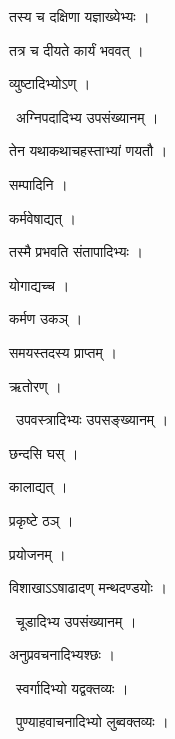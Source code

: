\documentclass[10pt, openany, oneside]{book}
\begin{document}
\noindent तस्य च दक्षिणा यज्ञाख्येभ्यः ।

\noindent तत्र च दीयते कार्यं भववत् ।

\noindent व्युष्टादिभ्योऽण् ।

\par\noindent\hspace{1.5em}{\vps वा॰}~{\qt अग्निपदादिभ्य उपसंख्यानम् ।}

\noindent तेन यथाकथाचहस्ताभ्यां णयतौ ।

\noindent सम्पादिनि ।

\noindent कर्मवेषाद्यत् ।

\noindent तस्मै प्रभवति संतापादिभ्यः ।

\noindent योगाद्यच्च ।

\noindent कर्मण उकञ् ।

\noindent समयस्तदस्य प्राप्तम् ।

\noindent ऋतोरण् ।

\par\noindent\hspace{1.5em}{\vps वा॰}~{\qt उपवस्त्रादिभ्यः उपसङ्ख्यानम् ।}

\noindent छन्दसि घस् ।

\noindent कालाद्यत् ।

\noindent प्रकृष्टे ठञ् ।

\noindent प्रयोजनम् ।

\noindent विशाखाऽऽषाढादण् मन्थदण्डयोः ।

\par\noindent\hspace{1.5em}{\vps वा॰}~{\qt चूडादिभ्य उपसंख्यानम् ।}

\noindent अनुप्रवचनादिभ्यश्छः ।

\par\noindent\hspace{1.5em}{\vps वा॰}~{\qt स्वर्गादिभ्यो यद्वक्तव्यः ।}

\par\noindent\hspace{1.5em}{\vps वा॰}~{\qt पुण्याहवाचनादिभ्यो लुब्वक्तव्यः ।}
\end{document}
